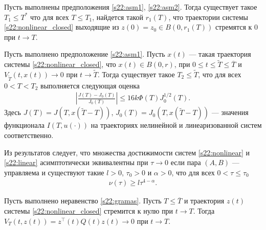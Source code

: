 \documentclass[../abstract.tex]{subfiles}
\begin{document}
\begin{theorem}\label{s22:th:tends_to_zero}
	Пусть выполнены предположения \ref{s22:asm1}, \ref{s22:asm2}. 
	Тогда существует такое $ T_1 \leqslant T^*$ что для всех $ T \leqslant T_1$, найдется такой $ r_1(T)$, что траектории системы \eqref{s22:nonlinear_closed} выходящие из $z(0) = z_0 \in B(0,r_1(T))$ стремятся к $0$ при $t \to T$.
\end{theorem}
\begin{theorem}\label{s22:th:functional_error_estimate}
	Пусть выполнено предположение \ref{s22:asm1}. 
	Пусть $x(t)$ --- такая траектория системы \eqref{s22:nonlinear_closed}, что $x(t)\in B(0,r)$, при $0\leqslant t \leqslant \tilde{T} \leqslant \overline{T} $ и $V_{\tilde{T}}(t,x(t))\to 0$ при $t\to \tilde{T}$. 
	Тогда существует такое $T_2 \leqslant \tilde{T}$, что для всех $0 < T < T_2 $ выполняется следующая оценка
	\begin{gather} \label{s22:est}
		\left| \frac{ J(T) - J_0(T)}{J_0(T)}\right| \leqslant 16k\Phi({T})J^{1/2}_0(T).
	\end{gather}
	Здесь $J(T)=J(T,x(\tilde{T}-T))$, $J_0(T)=J_0(T,x(\tilde{T}-T))$ --- значения функционала $I(T,u(\cdot))$ на траекториях нелинейной и линеаризованной систем соответственно.
\end{theorem}

Из результатов \cite{Polyak2001,GusevOsipovTrudy,Osipov,GusevMotor} следует, что множества достижимости 
систем \eqref{s22:nonlinear} и \eqref{s22:linear} асимптотически эквивалентны при $\tau \to 0$ если пара $(A,B)$ --- управляема 
и существуют такие $ l > 0$, $\tau_0 > 0$ и $\alpha > 0$, что для всех $0 < \tau \leqslant \tau_0 $
\begin{gather}\label{s22:gramas}
	\nu(\tau)\geqslant l\tau^{4-\alpha}.
\end{gather}

\begin{theorem}
	Пусть выполнено неравенство \eqref{s22:gramas}. 
	Пусть $T \leqslant \overline{T}$ и траектория $z(t)$ системы \eqref{s22:nonlinear_closed} стремится к нулю при $t\to T$. 
	Тогда $V_{T}(t,z(t)) =z^{\top}(t)Q(t)z(t) \to 0$ при $t \to T$.
\end{theorem}
\end{document}
